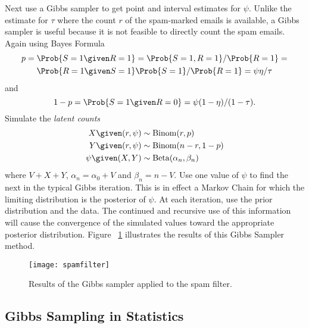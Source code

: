 \documentclass[12pt]{article}
\begin{document}
Next use a Gibbs sampler to get point and interval estimates for \( \psi
\).  Unlike the estimate for \( \tau \) where the count \( r \) of the
spam-marked emails is available, a Gibbs sampler is useful because it is
not feasible to directly count the spam emails.  Again using Bayes
Formula
\begin{multline*}
    p = \Prob{S=1 \given R = 1} = \Prob{S=1, R = 1}/\Prob{R = 1} = \\
    \Prob{R = 1 \given S=1} \Prob{S = 1}/\Prob{R = 1} = \psi\eta/\tau
\end{multline*}
and
\[
    1 - p = \Prob{S=1 \given R = 0} = \psi(1-\eta)/(1-\tau).
\] Simulate the \emph{latent counts}
\begin{align*}
    X \given (r,\psi) &\sim
    \operatorname{Binom}
    (r, p) \\
    Y \given (r,\psi) &\sim
    \operatorname{Binom}
    (n-r, 1-p) \\
    \psi \given (X,Y) &\sim
    \operatorname{Beta}
    (\alpha_n, \beta_n) \\
\end{align*}
where \( V + X + Y \), \( \alpha_n = \alpha_0 + V \) and \( \beta_n = n
- V \). Use one value of \( \psi \) to find the next in the typical
Gibbs iteration.  This is in effect a Markov Chain for which the
limiting distribution is the posterior of \( \psi \).  At each
iteration, use the prior distribution and the data.  The continued and
recursive use of this information will cause the convergence of the
simulated values toward the appropriate posterior distribution.  Figure~%
\ref{fig:gibbsampler:spamfilter} illustrates the results of this Gibbs
Sampler method.

\begin{figure}
    \centering
    \texttt{[image: spamfilter]}
    \caption{Results of the Gibbs sampler applied to the spam filter.}%
    \label{fig:gibbsampler:spamfilter}
\end{figure}

\subsection*{Gibbs Sampling in Statistics}
\end{document}
